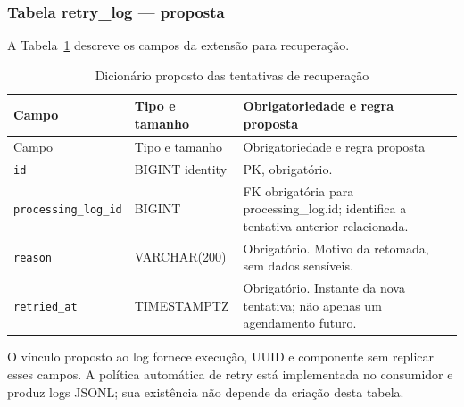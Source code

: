 \subsubsection{Tabela retry\_log --- proposta}
A Tabela~\ref{tab:dic-retry} descreve os campos da extensão para recuperação.
{\small
\begin{longtable}{>{\raggedright\arraybackslash}p{}>{\raggedright\arraybackslash}p{}>{\raggedright\arraybackslash}p{}}
\caption{Dicionário proposto das tentativas de recuperação}\label{tab:dic-retry}\\
\hline Campo & Tipo e tamanho & Obrigatoriedade e regra proposta\\ \hline
\endfirsthead
\hline Campo & Tipo e tamanho & Obrigatoriedade e regra proposta\\ \hline
\endhead
\texttt{id} & BIGINT identity & PK, obrigatório.\\ \hline
\texttt{processing\_log\_id} & BIGINT & FK obrigatória para processing\_log.id; identifica a tentativa anterior relacionada.\\ \hline
\texttt{reason} & VARCHAR(200) & Obrigatório. Motivo da retomada, sem dados sensíveis.\\ \hline
\texttt{retried\_at} & TIMESTAMPTZ & Obrigatório. Instante da nova tentativa; não apenas um agendamento futuro.\\ \hline
\end{longtable}
\par
}
O vínculo proposto ao log fornece execução, UUID e componente sem replicar esses campos. A política automática de retry está implementada no consumidor e produz logs JSONL; sua existência não depende da criação desta tabela.

